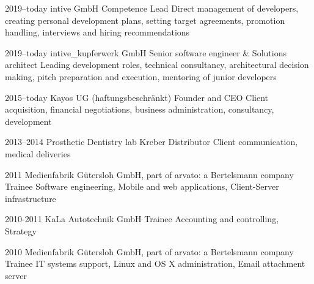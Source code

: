 \documentclass[]{friggeri-cv} %
\begin{document}
	\begin{entrylist}
		
	\entry
	{2019--today}
	{intive GmbH}
	{Competence Lead}
	{Direct management of developers, creating personal development plans, setting target agreements, promotion handling, interviews and hiring recommendations}
	
	
	\entry
	{2019--today}
	{intive\_kupferwerk GmbH}
	{Senior software engineer \& Solutions architect}
	{Leading development roles, technical consultancy, architectural decision making, pitch preparation and execution, mentoring of junior developers}
		
	
	\entry
	{2015--today}
	{Kayos UG (haftungsbeschr\"{a}nkt)}
	{Founder and CEO}
	{Client acquisition, financial negotiations, business administration, consultancy, development}

	
	\entry
	{2013--2014}
	{Prosthetic Dentistry lab Kreber}
	{Distributor}
	{Client communication, medical deliveries}
	
	
	\entry
	{2011}
	{Medienfabrik G\"{u}tersloh GmbH, part of arvato: a Bertelsmann company}
	{Trainee}
	{Software engineering, Mobile and web applications, Client-Server infrastructure}
	
	
	\entry
	{2010-2011}
	{KaLa Autotechnik GmbH}
	{Trainee}
	{Accounting and controlling, Strategy}

	
	
	\entry
	{2010}
	{Medienfabrik G\"{u}tersloh GmbH, part of arvato: a Bertelsmann company}
	{Trainee}
	{IT systems support, Linux and OS X administration, Email attachment server}


\end{entrylist}

\end{document}
